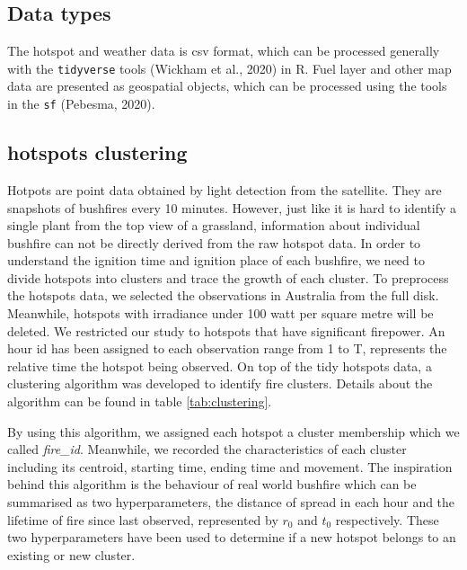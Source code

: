 \documentclass{monashthesis}
\begin{document}
\subsection{Data types}\label{data-types}

The hotspot and weather data is csv format, which can be processed
generally with the \texttt{tidyverse} tools (Wickham et al., 2020) in R.
Fuel layer and other map data are presented as geospatial objects, which
can be processed using the tools in the \texttt{sf} (Pebesma, 2020).

\subsection{hotspots clustering}\label{hotspots-clustering}

Hotpots are point data obtained by light detection from the satellite.
They are snapshots of bushfires every 10 minutes. However, just like it
is hard to identify a single plant from the top view of a grassland,
information about individual bushfire can not be directly derived from
the raw hotspot data. In order to understand the ignition time and
ignition place of each bushfire, we need to divide hotspots into
clusters and trace the growth of each cluster. To preprocess the
hotspots data, we selected the observations in Australia from the full
disk. Meanwhile, hotspots with irradiance under 100 watt per square
metre will be deleted. We restricted our study to hotspots that have
significant firepower. An hour id has been assigned to each observation
range from 1 to T, represents the relative time the hotspot being
observed. On top of the tidy hotspots data, a clustering algorithm was
developed to identify fire clusters. Details about the algorithm can be
found in table \ref{tab:clustering}.

By using this algorithm, we assigned each hotspot a cluster membership
which we called \emph{fire\_id}. Meanwhile, we recorded the
characteristics of each cluster including its centroid, starting time,
ending time and movement. The inspiration behind this algorithm is the
behaviour of real world bushfire which can be summarised as two
hyperparameters, the distance of spread in each hour and the lifetime of
fire since last observed, represented by \(r_0\) and \(t_0\)
respectively. These two hyperparameters have been used to determine if a
new hotspot belongs to an existing or new cluster.

\normalfont
\end{document}
